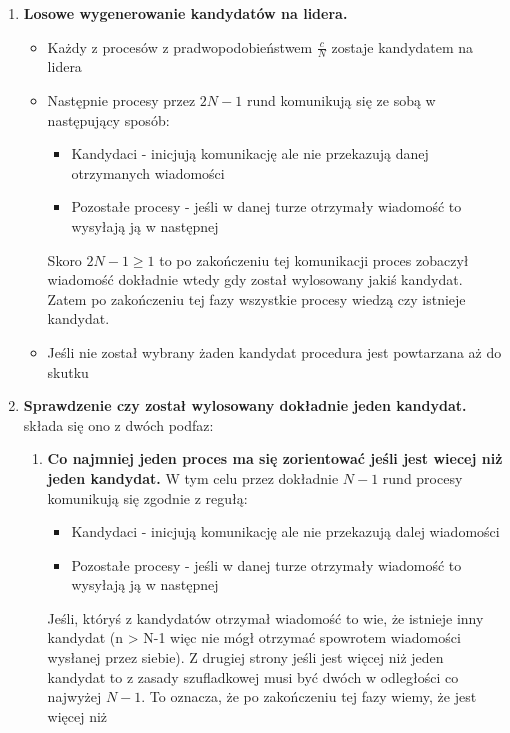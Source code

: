 \documentclass[11pt,a4paper]{article}
\begin{document}
\begin{enumerate}
    \item \textbf{Losowe wygenerowanie kandydatów na lidera.}
        \begin{itemize}
            \item Każdy z procesów z pradwopodobieństwem $\frac{c}{N}$ zostaje kandydatem na lidera
            \item Następnie procesy przez $2N-1$ rund komunikują się ze sobą w następujący sposób:
                \begin{itemize}
                    \item Kandydaci - inicjują komunikację ale nie przekazują danej otrzymanych wiadomości
                    \item Pozostałe procesy - jeśli w danej turze otrzymały wiadomość to wysyłają ją w następnej
                \end{itemize}
                Skoro $2N-1 \geq 1$ to po zakończeniu tej komunikacji proces zobaczył wiadomość dokładnie wtedy gdy został wylosowany jakiś kandydat.
                Zatem po zakończeniu tej fazy wszystkie procesy wiedzą czy istnieje kandydat.
            \item Jeśli nie został wybrany żaden kandydat procedura jest powtarzana aż do skutku
        \end{itemize}
    \item \textbf{Sprawdzenie czy został wylosowany dokładnie jeden kandydat.} składa się ono z dwóch podfaz: 
        \begin{enumerate}
            \item[2.1] \textbf{Co najmniej jeden proces ma się zorientować jeśli jest wiecej niż jeden kandydat.}
                W tym celu przez dokładnie $N-1$ rund procesy komunikują się zgodnie z regułą:
                \begin{itemize}
                    \item Kandydaci - inicjują komunikację ale nie przekazują dalej wiadomości
                    \item Pozostałe procesy - jeśli w danej turze otrzymały wiadomość to wysyłają ją w następnej
                \end{itemize}
                Jeśli, któryś z kandydatów otrzymał wiadomość to wie, że istnieje inny kandydat (n > N-1 więc nie mógł otrzymać spowrotem wiadomości wysłanej przez siebie). 
                Z drugiej strony jeśli jest więcej niż jeden kandydat to z zasady szufladkowej musi być dwóch w odległości co najwyżej $N-1$. To oznacza, że po zakończeniu tej fazy wiemy, że jest więcej niż

\end{enumerate}
\end{enumerate}
\end{document}

